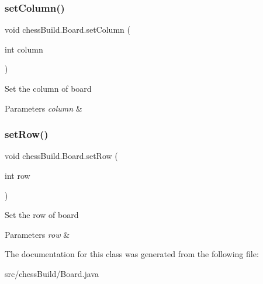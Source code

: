 \subsubsection{\texorpdfstring{set\+Column()}{setColumn()}}
{\footnotesize\ttfamily void chess\+Build.\+Board.\+set\+Column (\begin{DoxyParamCaption}\item[{int}]{column }\end{DoxyParamCaption})}

Set the column of board 
\begin{DoxyParams}{Parameters}
{\em column} & \\
\hline
\end{DoxyParams}
\mbox{\label{classchess_build_1_1_board_a1b83ee1026b863cb830768d555906931}} 
\subsubsection{\texorpdfstring{set\+Row()}{setRow()}}
{\footnotesize\ttfamily void chess\+Build.\+Board.\+set\+Row (\begin{DoxyParamCaption}\item[{int}]{row }\end{DoxyParamCaption})}

Set the row of board 
\begin{DoxyParams}{Parameters}
{\em row} & \\
\hline
\end{DoxyParams}


The documentation for this class was generated from the following file\+:\begin{DoxyCompactItemize}
\item 
src/chess\+Build/Board.\+java\end{DoxyCompactItemize}
